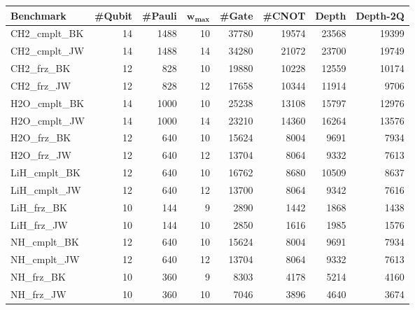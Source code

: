 \begin{tabular}{|l|r|r|r|r|r|r|r|}
    \hline
    \textbf{Benchmark} & \textbf{\#Qubit} & \textbf{\#Pauli} & $\mathbf{w_{\max}}$ & \textbf{\#Gate} & \textbf{\#CNOT}  & \textbf{Depth} & \textbf{Depth-2Q} \\
    \hline
    CH2\_cmplt\_BK & 14 & 1488 & 10 & 37780 & 19574 & 23568 & 19399 \\
    \hline
    CH2\_cmplt\_JW & 14 & 1488 & 14 & 34280 & 21072 & 23700 & 19749 \\
    \hline
    CH2\_frz\_BK & 12 & 828 & 10 & 19880 & 10228 & 12559 & 10174 \\
    \hline
    CH2\_frz\_JW & 12 & 828 & 12 & 17658 & 10344 & 11914 & 9706 \\
    \hline
    H2O\_cmplt\_BK & 14 & 1000 & 10 & 25238 & 13108 & 15797 & 12976 \\
    \hline
    H2O\_cmplt\_JW & 14 & 1000 & 14 & 23210 & 14360 & 16264 & 13576 \\
    \hline
    H2O\_frz\_BK & 12 & 640 & 10 & 15624 & 8004 & 9691 & 7934 \\
    \hline
    H2O\_frz\_JW & 12 & 640 & 12 & 13704 & 8064 & 9332 & 7613 \\
    \hline
    LiH\_cmplt\_BK & 12 & 640 & 10 & 16762 & 8680 & 10509 & 8637 \\
    \hline
    LiH\_cmplt\_JW & 12 & 640 & 12 & 13700 & 8064 & 9342 & 7616 \\
    \hline
    LiH\_frz\_BK & 10 & 144 & 9 & 2890 & 1442 & 1868 & 1438 \\
    \hline
    LiH\_frz\_JW & 10 & 144 & 10 & 2850 & 1616 & 1985 & 1576 \\
    \hline
    NH\_cmplt\_BK & 12 & 640 & 10 & 15624 & 8004 & 9691 & 7934 \\
    \hline
    NH\_cmplt\_JW & 12 & 640 & 12 & 13704 & 8064 & 9332 & 7613 \\
    \hline
    NH\_frz\_BK & 10 & 360 & 9 & 8303 & 4178 & 5214 & 4160 \\
    \hline
    NH\_frz\_JW & 10 & 360 & 10 & 7046 & 3896 & 4640 & 3674 \\
    \hline
\end{tabular}    
